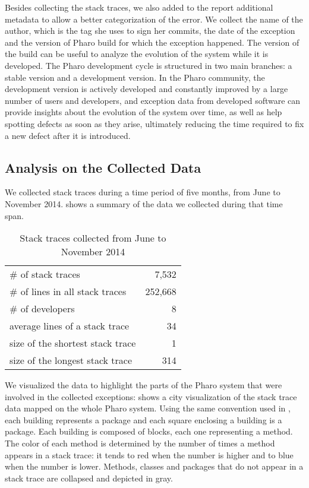 Besides collecting the stack traces, we also added to the report additional metadata to allow a better categorization of the error. We collect the name of the author, which is the tag she uses to sign her commits, the date of the exception and the version of Pharo build for which the exception happened. The version of the build can be useful to analyze the evolution of the system while it is developed. The Pharo development cycle is structured in two main branches: a stable version and a development version. In the Pharo community, the development version is actively developed and constantly improved by a large number of users and developers, and exception data from developed software can provide insights about the evolution of the system over time, as well as help spotting defects as soon as they arise, ultimately reducing the time required to fix a new defect after it is introduced.

\subsection{Analysis on the Collected Data}

We collected stack traces during a time period of five months, from June to November 2014.  shows a summary of the data we collected during that time span.

\begin{table}[h]
\caption{Stack traces collected from June to November 2014}
\begin{center}
\begin{tabular}{lr}
\# of stack traces & 7,532 \\
\# of lines in all stack traces & 252,668 \\
\# of developers & 8 \\
average lines of a stack trace & 34 \\
size of the shortest stack trace & 1 \\
size of the longest stack trace & 314 \\
\end{tabular}
\end{center}
\label{tab:data-summary}
\end{table}

We visualized the data to highlight the parts of the Pharo system that were involved in the collected exceptions:  shows a city visualization of the stack trace data mapped on the whole Pharo system. Using the same convention used in , each building represents a package and each square enclosing a building is a package. Each building is composed of blocks, each one representing a method. The color of each method is determined by the number of times a method appears in a stack trace: it tends to red when the number is higher and to blue when the number is lower. Methods, classes and packages that do not appear in a stack trace are collapsed and depicted in gray.

